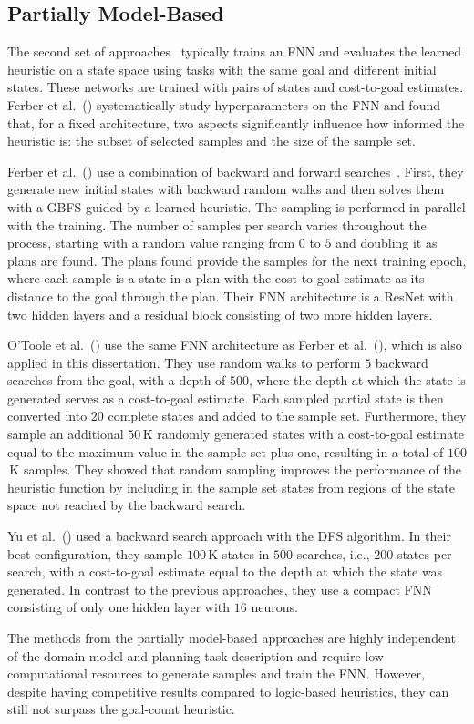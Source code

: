\subsection{Partially Model-Based}

The second set of approaches~\cite{Ferber.etal/2020a, Yu.etal/2020, Ferber.etal/2022, OToole/2022} typically trains an FNN and evaluates the learned heuristic on a state space using tasks with the same goal and different initial states. These networks are trained with pairs of states and cost-to-goal estimates. Ferber et al.~(\citeyear{Ferber.etal/2020a}) systematically study hyperparameters on the FNN and found that, for a fixed architecture, two aspects significantly influence how informed the heuristic is: the subset of selected samples and the size of the sample set.

Ferber et al.~(\citeyear{Ferber.etal/2022}) use a combination of backward and forward searches~\cite{Arfaee.etal/2011}. First, they generate new initial states with backward random walks and then solves them with a GBFS guided by a learned heuristic. The sampling is performed in parallel with the training. The number of samples per search varies throughout the process, starting with a random value ranging from $0$ to $5$ and doubling it as plans are found. The plans found provide the samples for the next training epoch, where each sample is a state in a plan with the cost-to-goal estimate as its distance to the goal through the plan. Their FNN architecture is a ResNet with two hidden layers and a residual block consisting of two more hidden layers.

O'Toole et al.~(\citeyear{OToole/2022}) use the same FNN architecture as Ferber et al.~(\citeyear{Ferber.etal/2022}), which is also applied in this dissertation. They use random walks to perform $5$ backward searches from the goal, with a depth of $500$, where the depth at which the state is generated serves as a cost-to-goal estimate. Each sampled partial state is then converted into $20$ complete states and added to the sample set. Furthermore, they sample an additional $50$\,K randomly generated states with a cost-to-goal estimate equal to the maximum value in the sample set plus one, resulting in a total of $100$\,K samples. They showed that random sampling improves the performance of the heuristic function by including in the sample set states from regions of the state space not reached by the backward search.

Yu et al.~(\citeyear{Yu.etal/2020}) used a backward search approach with the DFS algorithm. In their best configuration, they sample $100$\,K states in $500$ searches, i.e., $200$ states per search, with a cost-to-goal estimate equal to the depth at which the state was generated. In contrast to the previous approaches, they use a compact FNN consisting of only one hidden layer with $16$ neurons.

The methods from the partially model-based approaches are highly independent of the domain model and planning task description and require low computational resources to generate samples and train the FNN. However, despite having competitive results compared to logic-based heuristics, they can still not surpass the goal-count heuristic.
